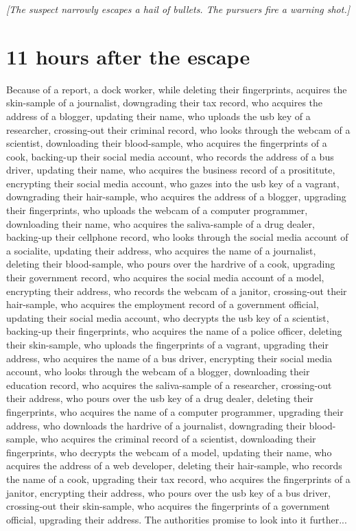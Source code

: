 \documentclass{report}
\begin{document}
\textit{[The suspect narrowly escapes a hail of bullets. The pursuers fire a warning shot.]}


\section*{11 \small{hours after the escape}}

Because of a report, a dock worker, while deleting their fingerprints, acquires the skin-sample of a journalist, downgrading their tax record, who acquires the address of a blogger, updating their name, who uploads the usb key of a researcher, crossing-out their criminal record, who looks through the webcam of a scientist, downloading their blood-sample, who acquires the fingerprints of a cook, backing-up their social media account, who records the address of a bus driver, updating their name, who acquires the business record of a prosititute, encrypting their social media account, who gazes into the usb key of a vagrant, downgrading their hair-sample, who acquires the address of a blogger, upgrading their fingerprints, who uploads the webcam of a computer programmer, downloading their name, who acquires the saliva-sample of a drug dealer, backing-up their cellphone record, who looks through the social media account of a socialite, updating their address, who acquires the name of a journalist, deleting their blood-sample, who pours over the hardrive of a cook, upgrading their government record, who acquires the social media account of a model, encrypting their address, who records the webcam of a janitor, crossing-out their hair-sample, who acquires the employment record of a government official, updating their social media account, who decrypts the usb key of a scientist, backing-up their fingerprints, who acquires the name of a police officer, deleting their skin-sample, who uploads the fingerprints of a vagrant, upgrading their address, who acquires the name of a bus driver, encrypting their social media account, who looks through the webcam of a blogger, downloading their education record, who acquires the saliva-sample of a researcher, crossing-out their address, who pours over the usb key of a drug dealer, deleting their fingerprints, who acquires the name of a computer programmer, upgrading their address, who downloads the hardrive of a journalist, downgrading their blood-sample, who acquires the criminal record of a scientist, downloading their fingerprints, who decrypts the webcam of a model, updating their name, who acquires the address of a web developer, deleting their hair-sample, who records the name of a cook, upgrading their tax record, who acquires the fingerprints of a janitor, encrypting their address, who pours over the usb key of a bus driver, crossing-out their skin-sample, who acquires the fingerprints of a government official, upgrading their address. The authorities promise to look into it further...
\end{document}
